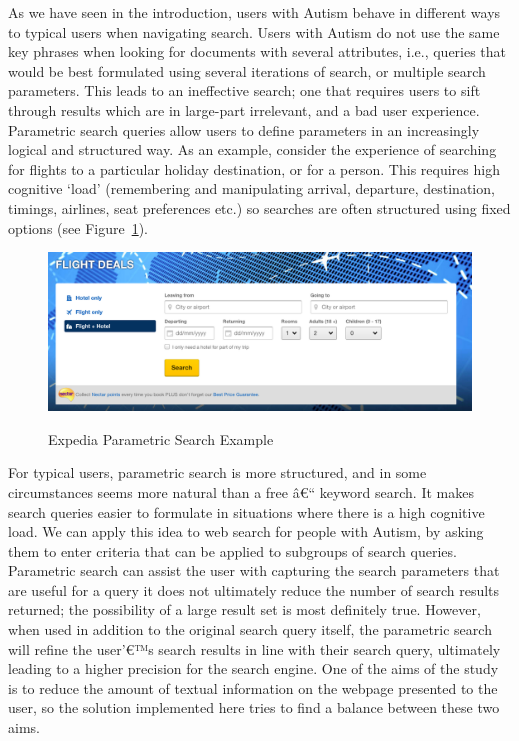 \documentclass[a4paper, 11pt]{article}
\begin{document}
\vspace{5mm}
As we have seen in the introduction, users with Autism behave in different ways to typical users when navigating search. Users with Autism do not use the same key phrases when looking for documents with several attributes, i.e., queries that would be best formulated using several iterations of search, or multiple search parameters. This leads to an ineffective search; one that requires users to sift through results which are in large-part irrelevant, and a bad user experience.  
\vspace{5mm}
Parametric search queries allow users to define parameters in an increasingly logical and structured way. As an example, consider the experience of searching for flights to a particular holiday destination, or for a person. This requires high cognitive `load' (remembering and manipulating arrival, departure, destination, timings, airlines, seat preferences etc.) so searches are often structured using fixed options (see Figure~\ref{exped}).

\begin{figure}[H]
\begin{center}
\includegraphics[scale=0.3]{expedia}\\

\caption{Expedia Parametric Search Example}
\label{exped}
\end{center}
\end{figure}

For typical users, parametric search is more structured, and in some circumstances seems more natural than a free â€“ keyword search. It makes search queries easier to formulate in situations where there is a high cognitive load.  We can apply this idea to web search for people with Autism, by asking them to enter criteria that can be applied to subgroups of search queries. Parametric search can assist the user with capturing the search parameters that are useful for a query it does not ultimately reduce the number of search results returned; the possibility of a large result set is most definitely true. However, when used in addition to the original search query itself, the parametric search will refine the user'€™s search results in line with their search query, ultimately leading to a higher precision for the search engine.
\vspace{5mm}
One of the aims of the study is to reduce the amount of textual information on the webpage presented to the user, so the solution implemented here tries to find a balance between these two aims.\\  
\end{document}
